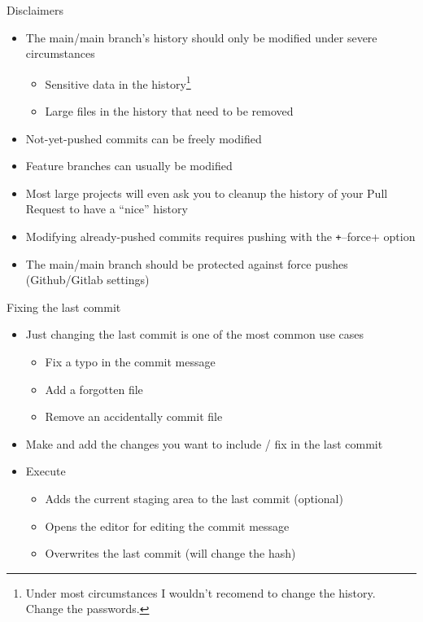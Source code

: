 \begin{frame}[c]{Disclaimers}
  \begin{itemize}
    \item The main/main branch's history should only be modified under severe circumstances\\
      \begin{itemize}
        \item Sensitive data in the history\footnote{Under most circumstances I wouldn't recomend to change the history. Change the passwords.}
        \item Large files in the history that need to be removed
      \end{itemize}
    \item Not-yet-pushed commits can be freely modified
    \item Feature branches can usually be modified
    \item Most large projects will even ask you to cleanup the history of your Pull Request to have a \enquote{nice} history
    \item Modifying already-pushed commits requires pushing with the \texttt+--force+ option
    \item The main/main branch should be protected against force pushes\\
      (Github/Gitlab settings)
  \end{itemize}
\end{frame}

\begin{frame}[c, fragile]{Fixing the last commit}
  \begin{itemize}
    \item Just changing the last commit is one of the most common use cases
      \begin{itemize}
        \item Fix a typo in the commit message
        \item Add a forgotten file
        \item Remove an accidentally commit file
      \end{itemize}
    \item Make and add the changes you want to include / fix in the last commit
    \item Execute
      \begin{itemize}
        \item Adds the current staging area to the last commit (optional)
        \item Opens the editor for editing the commit message
        \item Overwrites the last commit (will change the hash)
      \end{itemize}
  \end{itemize}
\end{frame}

